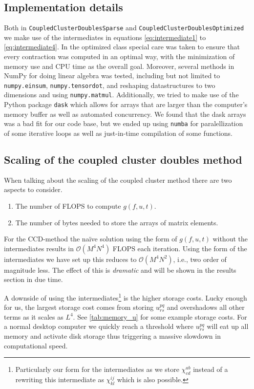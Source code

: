 \documentclass[
    a4paper, aps, twocolumn, floatfix, superscriptaddress,
    nofootinbib]{revtex4-1}
\newcommand{\1}{\mathds{1}}
\begin{document}
    \subsection{Implementation details}
        Both in \texttt{CoupledClusterDoublesSparse} and
        \texttt{CoupledClusterDoublesOptimized} we make use of the
        intermediates in equations \ref{eq:intermediate1} to
        \ref{eq:intermediate4}.  In the optimized class special care was taken
        to ensure that every contraction was computed in an optimal way, with
        the minimization of memory use and CPU time as the overall goal.
        Moreover, several methods in NumPy for doing linear algebra was tested,
        including but not limited to \texttt{numpy.einsum},
        \texttt{numpy.tensordot}, and reshaping datastructures to
        two dimensions and using \texttt{numpy.matmul}.
        Additionally, we tried to make use of the Python package
        \texttt{dask} which allows for arrays that are larger than
        the computer's memory buffer as well as automated concurrency. We found
        that the dask arrays was a bad fit for our code base, but we ended up
        using \texttt{numba} for paralellization of some
        iterative loops as well as just-in-time compilation of some functions.

    \subsection{Scaling of the coupled cluster doubles method}
        When talking about the scaling of the coupled cluster method there are
        two aspects to consider.
        \begin{enumerate}
            \item The number of FLOPS to compute $g(f, u, t)$.
            \item The number of bytes needed to store the arrays of matrix
                elements.
        \end{enumerate}
        For the CCD-method the naïve solution using the form of $g(f, u, t)$
        without the intermediates results in $\mathcal{O}(M^4N^4)$ FLOPS each
        iteration. Using the form of the intermediates we have set up this
        reduces to $\mathcal{O}(M^4N^2)$, i.e., two order of magnitude less. The
        effect of this is \emph{dramatic} and will be shown in the results
        section in due time.

        A downside of using the intermediates\footnote{Particularly our form for
        the intermediates as we store $\chi^{ab}_{cd}$ instead of a rewriting
        this intermediate as $\chi^{ij}_{kl}$ which is also possible.} is the
        higher storage costs. Lucky enough for us, the largest storage cost
        comes from storing $u^{pq}_{rs}$ and overshadows all other terms as it
        scales as $L^4$. See \autoref{tab:memory_u} for some example storage
        costs. For a normal desktop computer we quickly reach a threshold where
        $u^{pq}_{rs}$ will eat up all memory and activate disk storage thus
        triggering a massive slowdown in computational speed.
\end{document}
